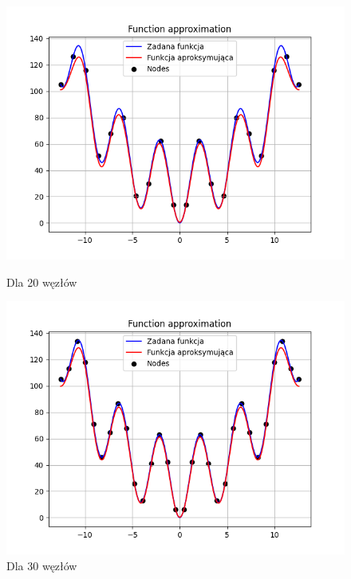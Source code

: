 \documentclass{article}
\begin{document}
\begin{figure}[H]
  \begin{minipage}[b]{0.49\textwidth}
    \begin{minipage}[b]{\textwidth}
      \includegraphics[width=\textwidth]{img39.png}
      \caption{Dla 20 węzłów}
    \end{minipage}
    \vspace*{\fill}
    \begin{minipage}[b]{\textwidth}
      \includegraphics[width=\textwidth]{img40.png}
      \caption{Dla 30 węzłów}
    \end{minipage}
  \end{minipage}
  \hfill
  \begin{minipage}[b]{0.49\textwidth}

\end{minipage}
\end{figure}
\end{document}
